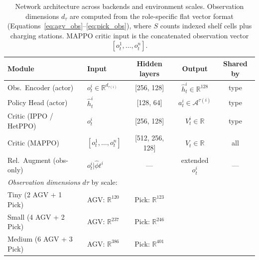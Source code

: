 \documentclass[Afour,sageh,times]{sagej}
\begin{document}
\begin{table}[!htbp]
\centering
\caption{Network architecture across backends and environment scales. Observation dimensions $d_{\tau}$ are computed from the role-specific flat vector format (Equations~\ref{eq:agv_obs}--\ref{eq:pick_obs}), where $S$ counts indexed shelf cells plus charging stations. MAPPO critic input is the concatenated observation vector $[o_t^1,\ldots,o_t^n]$.}
\label{tab:network_arch}
\begin{tabular}{llccc}
\toprule
\textbf{Module} & \textbf{Input} & \textbf{Hidden layers} & \textbf{Output} & \textbf{Shared by} \\
\midrule
Obs.\ Encoder (actor) & $o_t^i \in \mathbb{R}^{d_{\tau(i)}}$ & [256, 128] & $\hat{h}_t^i \in \mathbb{R}^{128}$ & type \\
Policy Head (actor) & $\hat{h}_t^i$ & [128, 64] & $a_t^i \in \mathcal{A}^{\tau(i)}$ & type \\
Critic (IPPO / HetPPO) & $o_t^i$ & [256, 128] & $V_t^i \in \mathbb{R}$ & type \\
Critic (MAPPO) & $[o_t^1,\ldots,o_t^n]$ & [512, 256, 128] & $V_t \in \mathbb{R}$ & all \\
Rel.\ Augment (obs-only) & $o_t^i | \hat{\phi}t^i$ & — & extended $o_t^i$ & — \\
\midrule
\multicolumn{5}{l}{\textit{Observation dimensions} $d{\tau}$ by scale:} \\
\quad Tiny (2 AGV + 1 Pick) & AGV: $\mathbb{R}^{120}$ & Pick: $\mathbb{R}^{123}$ & & \\
\quad Small (4 AGV + 2 Pick) & AGV: $\mathbb{R}^{237}$ & Pick: $\mathbb{R}^{246}$ & & \\
\quad Medium (6 AGV + 3 Pick) & AGV: $\mathbb{R}^{386}$ & Pick: $\mathbb{R}^{401}$ & & \\
\bottomrule
\end{tabular}
\end{table}


\end{document}
